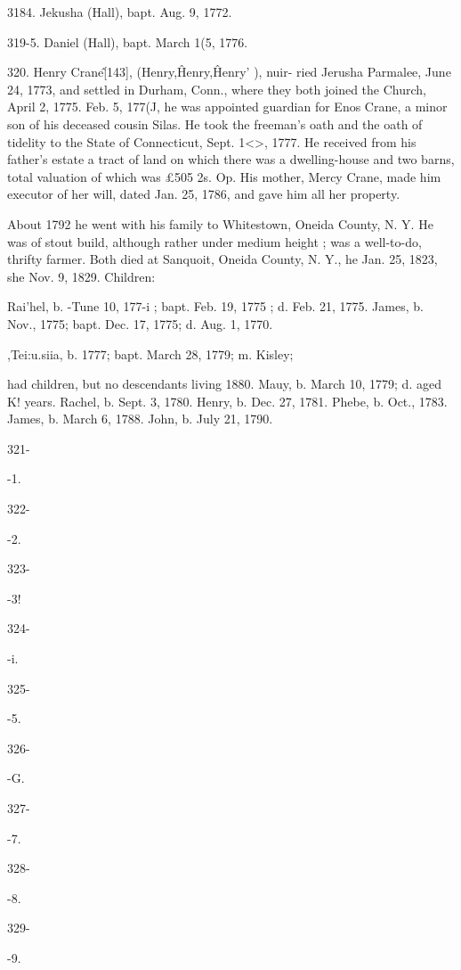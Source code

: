 \documentclass{book}
\begin{document}
3184. Jekusha (Hall), bapt. Aug. 9, 1772. 

319-5. Daniel (Hall), bapt. March 1(5, 1776. 

320. Henry Crane\^ [143], (Henry,\^ Henry,\^ Henry' ), nuir- 
ried Jerusha Parmalee, June 24, 1773, and settled in Durham, 
Conn., where they both joined the Church, April 2, 1775. Feb. 
5, 177(J, he was appointed guardian for Enos Crane, a minor son 
of his deceased cousin Silas. He took the freeman's oath and 
the oath of tidelity to the State of Connecticut, Sept. 1<>, 1777. 
He received from his father's estate a tract of land on which there 
was a dwelling-house and two barns, total valuation of which was 
£505  2s.  Op. His mother, Mercy Crane, made him executor 
of her will, dated Jan. 25, 1786, and gave him all her property. 




About 1792 he went with his family to Whitestown, Oneida 
County, N. Y. He was of stout build, although rather under 
medium height ; was a well-to-do, thrifty farmer. Both died at 
Sanquoit, Oneida County, N. Y., he Jan. 25, 1823, she Nov. 9, 
1829. Children: 

Rai'hel, b. -Tune 10, 177-i ; bapt. Feb. 19, 1775 ; d. Feb. 21, 1775. 
James, b. Nov., 1775; bapt. Dec. 17, 1775; d. Aug. 1, 1770. 

,Tei:u.siia, b. 1777; bapt. March 28, 1779; m. Kisley; 

had children, but no descendants living 1880. 
Mauy, b. March 10, 1779; d. aged K! years. 
Rachel, b. Sept. 3, 1780. 
Henry, b. Dec. 27, 1781. 
Phebe, b. Oct., 1783. 
James, b. March 6, 1788. 
John, b. July 21, 1790. 



321- 


-1. 


322- 


-2. 


323- 


-3! 


324- 


-i. 


325- 


-5. 


326- 


-G. 


327- 


-7. 


328- 


-8. 


329- 


-9. 
\end{document}
